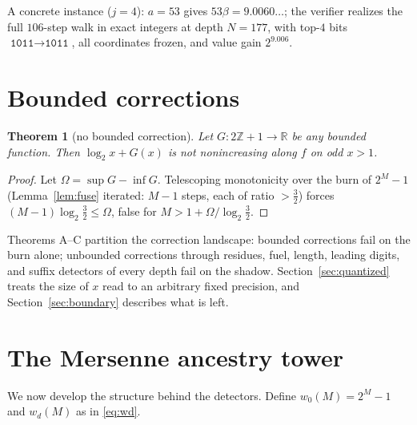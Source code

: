 \documentclass[11pt]{article}
\newtheorem{theorem}{Theorem}[section]
\theoremstyle{definition}
\theoremstyle{remark}
\newcommand{\Z}{\mathbb{Z}}
\newcommand{\R}{\mathbb{R}}
\begin{document}
A concrete instance ($j=4$): $a=53$ gives $53\beta=9.0060\ldots$; the
verifier realizes the full $106$-step walk in exact integers at depth
$N=177$, with top-$4$ bits $\texttt{1011}\to\texttt{1011}$, all
coordinates frozen, and value gain $2^{9.006}$.

\section{Bounded corrections}\label{sec:bounded}

\begin{theorem}[no bounded correction]\label{thm:C}
Let $G:2\Z+1\to\R$ be any bounded function. Then $\log_2x+G(x)$ is not
nonincreasing along $f$ on odd $x>1$.
\end{theorem}

\begin{proof}
Let $\Omega=\sup G-\inf G$. Telescoping monotonicity over the burn of
$2^{M}-1$ (Lemma~\ref{lem:fuse} iterated: $M-1$ steps, each of ratio
$>\tfrac32$) forces $(M-1)\log_2\tfrac32\le\Omega$, false for
$M>1+\Omega/\log_2\tfrac32$.
\end{proof}

Theorems A--C partition the correction landscape: bounded corrections
fail on the burn alone; unbounded corrections through residues, fuel,
length, leading digits, and suffix detectors of every depth fail on
the shadow. Section~\ref{sec:quantized} treats the size of $x$ read to
an arbitrary fixed precision, and Section~\ref{sec:boundary} describes
what is left.

\section{The Mersenne ancestry tower}\label{sec:tower}

We now develop the structure behind the detectors. Define
$w_0(M)=2^{M}-1$ and $w_d(M)$ as in \eqref{eq:wd}.
\end{document}
